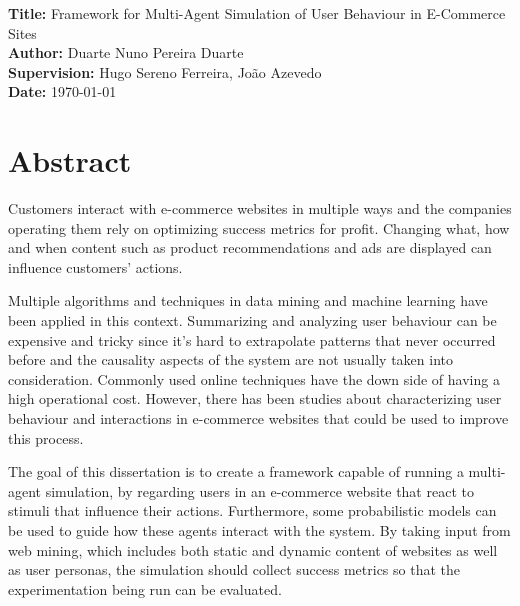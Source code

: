 \documentclass[11pt,a4paper]{article}
\newcommand{\titles}[2]{\noindent\textbf{#1:} #2\\[2mm]}
\begin{document}
\titles{Title}{Framework for Multi-Agent Simulation of User Behaviour in 
E-Commerce Sites}
\titles{Author}{Duarte Nuno Pereira Duarte}
\titles{Supervision}{Hugo Sereno Ferreira, João Azevedo}
\titles{Date}{\today}

\section*{Abstract}

Customers interact with e-commerce websites in multiple ways and the
companies operating them rely on optimizing success metrics for profit. 
Changing what, how and when content such as product recommendations and ads are 
displayed can influence customers' actions.

Multiple algorithms and techniques in data mining and machine learning
have been applied in this context. Summarizing and analyzing user
behaviour can be expensive and tricky since it's hard to extrapolate
patterns that never occurred before and the causality aspects of the
system are not usually taken into consideration. Commonly used online
techniques have the down side of having a high operational cost. However, there 
has been studies about characterizing user behaviour and interactions in 
e-commerce websites that could be used to improve this process.

The goal of this dissertation is to create a framework capable of running
a multi-agent simulation, by regarding users in an e-commerce website that
react to stimuli that influence their actions. Furthermore, some probabilistic 
models can be used to guide how these agents interact with the system. By 
taking input from web mining, which includes both static and dynamic content of 
websites as well as user personas, the simulation should collect success 
metrics so that the experimentation being run can be evaluated.

\nocite{*}  %



\end{document}
